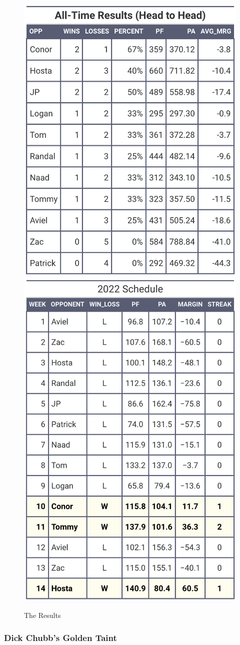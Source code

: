 \documentclass[
]{article}
\begin{document}
\begin{figure}
\includegraphics[width=0.5\linewidth,height=0.5\textheight]{output/headtohead/Montel_head_to_head} \includegraphics[width=0.5\linewidth,height=0.5\textheight]{output/py_schedule/season_results_Montel} \caption{The Results}\label{fig:unnamed-chunk-13}
\end{figure}

\hypertarget{dick-chubbs-golden-taint}{%
\subsubsection{Dick Chubb's Golden
Taint}\label{dick-chubbs-golden-taint}}
\end{document}

